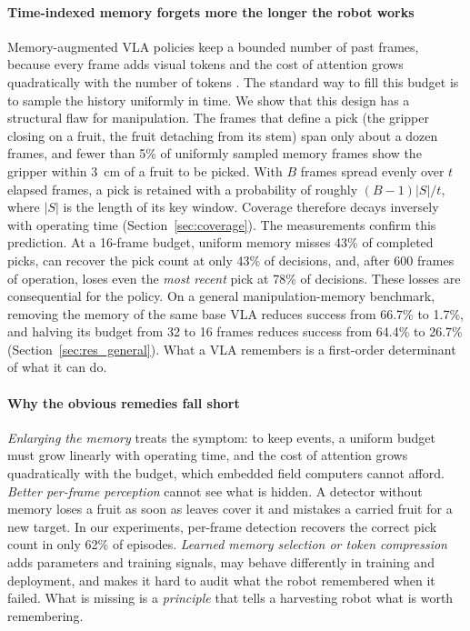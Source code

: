 \paragraph{Time-indexed memory forgets more the longer the robot works} Memory-augmented VLA policies keep a bounded number of past frames, because every frame adds visual tokens and the cost of attention grows quadratically with the number of tokens \citep{vaswani2017attention}. The standard way to fill this budget is to sample the history uniformly in time. We show that this design has a structural flaw for manipulation. The frames that define a pick (the gripper closing on a fruit, the fruit detaching from its stem) span only about a dozen frames, and fewer than 5\% of uniformly sampled memory frames show the gripper within 3~cm of a fruit to be picked. With $B$ frames spread evenly over $t$ elapsed frames, a pick is retained with a probability of roughly $(B-1)|S|/t$, where $|S|$ is the length of its key window. Coverage therefore decays inversely with operating time (Section~\ref{sec:coverage}). The measurements confirm this prediction. At a 16-frame budget, uniform memory misses 43\% of completed picks, can recover the pick count at only 43\% of decisions, and, after 600 frames of operation, loses even the \emph{most recent} pick at 78\% of decisions. These losses are consequential for the policy. On a general manipulation-memory benchmark, removing the memory of the same base VLA reduces success from 66.7\% to 1.7\%, and halving its budget from 32 to 16 frames reduces success from 64.4\% to 26.7\% (Section~\ref{sec:res_general}). What a VLA remembers is a first-order determinant of what it can do.

\paragraph{Why the obvious remedies fall short} \emph{Enlarging the memory} treats the symptom: to keep events, a uniform budget must grow linearly with operating time, and the cost of attention grows quadratically with the budget, which embedded field computers cannot afford. \emph{Better per-frame perception} cannot see what is hidden. A detector without memory loses a fruit as soon as leaves cover it and mistakes a carried fruit for a new target. In our experiments, per-frame detection recovers the correct pick count in only 62\% of episodes. \emph{Learned memory selection or token compression} adds parameters and training signals, may behave differently in training and deployment, and makes it hard to audit what the robot remembered when it failed. What is missing is a \emph{principle} that tells a harvesting robot what is worth remembering.

